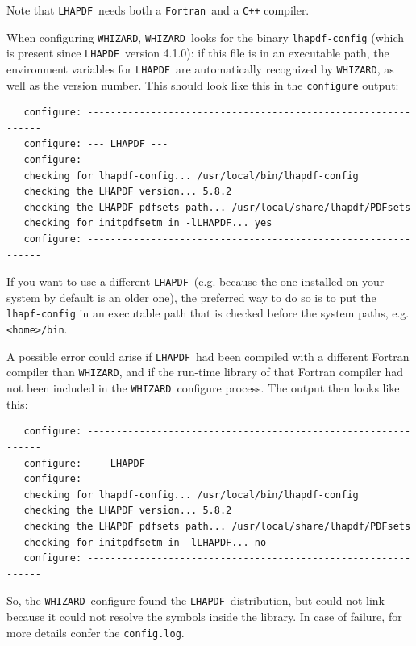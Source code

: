 \documentclass[12pt]{book}
\newcommand{\ttt}[1]{\texttt{#1}}
\newcommand{\whizard}{\texttt{WHIZARD}}
\newcommand{\lhapdf}{\texttt{LHAPDF}}
\newcommand{\fortran}{\texttt{Fortran}}
\begin{document}
Note that \lhapdf\ needs both a \fortran\ and a \ttt{C++} compiler.

When configuring \whizard, \whizard\ looks for the binary
\ttt{lhapdf-config} (which is present since \lhapdf\ version 4.1.0): if
this file is in an executable path, the environment variables for
\lhapdf\ are automatically recognized by \whizard, as well as the version
number. This should look like this in the \ttt{configure} output:   

\begin{footnotesize}
\begin{verbatim}
   configure: --------------------------------------------------------------
   configure: --- LHAPDF ---
   configure:
   checking for lhapdf-config... /usr/local/bin/lhapdf-config
   checking the LHAPDF version... 5.8.2
   checking the LHAPDF pdfsets path... /usr/local/share/lhapdf/PDFsets
   checking for initpdfsetm in -lLHAPDF... yes
   configure: --------------------------------------------------------------
\end{verbatim}
\end{footnotesize}

If you want to use a different \lhapdf\ (e.g. because the one installed
on your system by default is an older one), the preferred way to do so
is to put the \ttt{lhapf-config} in an executable path that is checked
before the system paths, e.g. \ttt{<home>/bin}. 

A possible error could arise if \lhapdf\ had been compiled with a
different Fortran compiler than \whizard, and if the run-time library
of that Fortran compiler had not been included in the \whizard\
configure process. The output then looks like this:

\begin{footnotesize}
\begin{verbatim}
   configure: --------------------------------------------------------------
   configure: --- LHAPDF ---
   configure:
   checking for lhapdf-config... /usr/local/bin/lhapdf-config
   checking the LHAPDF version... 5.8.2
   checking the LHAPDF pdfsets path... /usr/local/share/lhapdf/PDFsets
   checking for initpdfsetm in -lLHAPDF... no
   configure: --------------------------------------------------------------
\end{verbatim}
\end{footnotesize}

So, the \whizard\ configure found the \lhapdf\ distribution, but could
not link because it could not resolve the symbols inside the
library. In case of failure, for more details confer the
\ttt{config.log}. 
\end{document}
